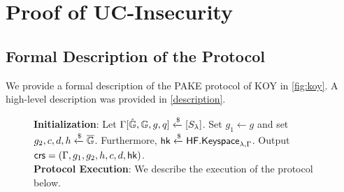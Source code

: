 
\section{Proof of UC-Insecurity}

\subsection{Formal Description of the Protocol}

We provide a formal description of the PAKE protocol of KOY in \cref{fig:koy}. A high-level description was provided in \cref{description}.

	\begin{figure}[tbp]
	\begin{framed}\small

		\textbf{Initialization}: Let $\Gamma[\hat{\mathbb{G}},\mathbb{G},g,q]\xleftarrow{\$}[S_\lambda]$. Set $g_1\gets g$ and set $g_2, c, d, h\xleftarrow{\$}\overline{\mathbb{G}}$. Furthermore, $\mathsf{hk}\xleftarrow{\$}\mathsf{HF.Keyspace}_{\lambda,\Gamma}$. Output $\mathsf{crs} = (\Gamma,g_1, g_2,h,c,d,\mathsf{hk})$.\\
		
		\textbf{Protocol Execution}: We describe the execution of the protocol below.
		

\end{framed}
\end{figure}
